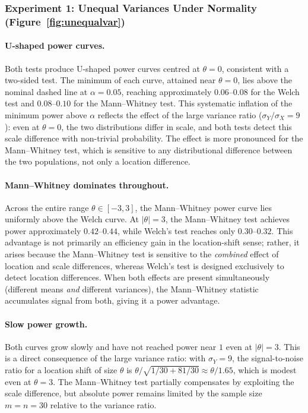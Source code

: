 \documentclass[10pt]{article}
\begin{document}
\subsubsection{Experiment 1: Unequal Variances Under Normality
(Figure~\ref{fig:unequalvar})}

\paragraph{U-shaped power curves.}
Both tests produce U-shaped power curves centred at $\theta = 0$, consistent
with a two-sided test. The minimum of each curve, attained near $\theta = 0$,
lies above the nominal dashed line at $\alpha = 0.05$, reaching approximately
$0.06$--$0.08$ for the Welch test and $0.08$--$0.10$ for the Mann--Whitney test.
This systematic inflation of the minimum power above $\alpha$ reflects the
effect of the large variance ratio ($\sigma_Y/\sigma_X = 9$): even at
$\theta = 0$, the two distributions differ in scale, and both tests detect this
scale difference with non-trivial probability. The effect is more pronounced for
the Mann--Whitney test, which is sensitive to any distributional difference
between the two populations, not only a location difference.

\paragraph{Mann--Whitney dominates throughout.}
Across the entire range $\theta \in [-3, 3]$, the Mann--Whitney power curve
lies uniformly above the Welch curve. At $|\theta| = 3$, the Mann--Whitney
test achieves power approximately $0.42$--$0.44$, while Welch's test reaches
only $0.30$--$0.32$. This advantage is not primarily an efficiency gain in the
location-shift sense; rather, it arises because the Mann--Whitney test is
sensitive to the \textit{combined} effect of location and scale differences,
whereas Welch's test is designed exclusively to detect location differences.
When both effects are present simultaneously (different means \textit{and}
different variances), the Mann--Whitney statistic accumulates signal from both,
giving it a power advantage.

\paragraph{Slow power growth.}
Both curves grow slowly and have not reached power near $1$ even at
$|\theta| = 3$. This is a direct consequence of the large variance ratio:
with $\sigma_Y = 9$, the signal-to-noise ratio for a location shift of size
$\theta$ is $\theta / \sqrt{1/30 + 81/30} \approx \theta / 1.65$, which is
modest even at $\theta = 3$. The Mann--Whitney test partially compensates by
exploiting the scale difference, but absolute power remains limited by the
sample size $m = n = 30$ relative to the variance ratio.
\end{document}
